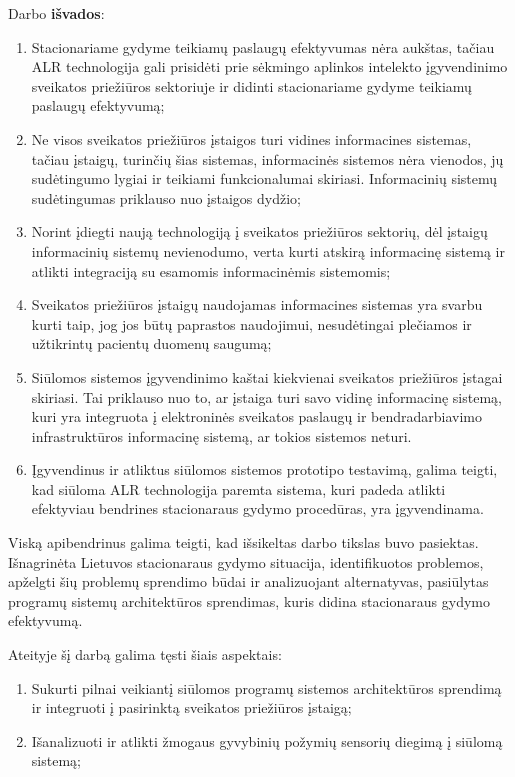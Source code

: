 Darbo \textbf{išvados}:
\begin{enumerate}
    \item Stacionariame gydyme teikiamų paslaugų efektyvumas nėra aukštas, tačiau ALR technologija gali prisidėti prie sėkmingo aplinkos intelekto įgyvendinimo sveikatos priežiūros sektoriuje ir didinti stacionariame gydyme teikiamų paslaugų efektyvumą;
    \item Ne visos sveikatos priežiūros įstaigos turi vidines informacines sistemas, tačiau įstaigų, turinčių šias sistemas, informacinės sistemos nėra vienodos, jų sudėtingumo lygiai ir teikiami funkcionalumai skiriasi. Informacinių sistemų sudėtingumas priklauso nuo įstaigos dydžio;
    \item Norint įdiegti naują technologiją į sveikatos priežiūros sektorių, dėl įstaigų informacinių sistemų nevienodumo, verta kurti atskirą informacinę sistemą ir atlikti integraciją su esamomis informacinėmis sistemomis;
    \item Sveikatos priežiūros įstaigų naudojamas informacines sistemas yra svarbu kurti taip, jog jos būtų paprastos naudojimui, nesudėtingai plečiamos ir užtikrintų pacientų duomenų saugumą;
    \item Siūlomos sistemos įgyvendinimo kaštai kiekvienai sveikatos priežiūros įstagai skiriasi. Tai priklauso nuo to, ar įstaiga turi savo vidinę informacinę sistemą, kuri yra integruota į elektroninės sveikatos paslaugų ir bendradarbiavimo infrastruktūros informacinę sistemą, ar tokios sistemos neturi.
    \item Įgyvendinus ir atliktus siūlomos sistemos prototipo testavimą, galima teigti, kad siūloma ALR technologija paremta sistema, kuri padeda atlikti efektyviau bendrines stacionaraus gydymo procedūras, yra įgyvendinama.
\end{enumerate}

Viską apibendrinus galima teigti, kad išsikeltas darbo tikslas buvo pasiektas. Išnagrinėta Lietuvos stacionaraus gydymo situacija, identifikuotos problemos, apželgti šių problemų sprendimo būdai ir analizuojant alternatyvas, pasiūlytas programų sistemų architektūros sprendimas, kuris didina stacionaraus gydymo efektyvumą.

Ateityje šį darbą galima tęsti šiais aspektais:
\begin{enumerate}
    \item Sukurti pilnai veikiantį siūlomos programų sistemos architektūros sprendimą ir integruoti į pasirinktą sveikatos priežiūros įstaigą;
    \item Išanalizuoti ir atlikti žmogaus gyvybinių požymių sensorių diegimą į siūlomą sistemą;
\end{enumerate}